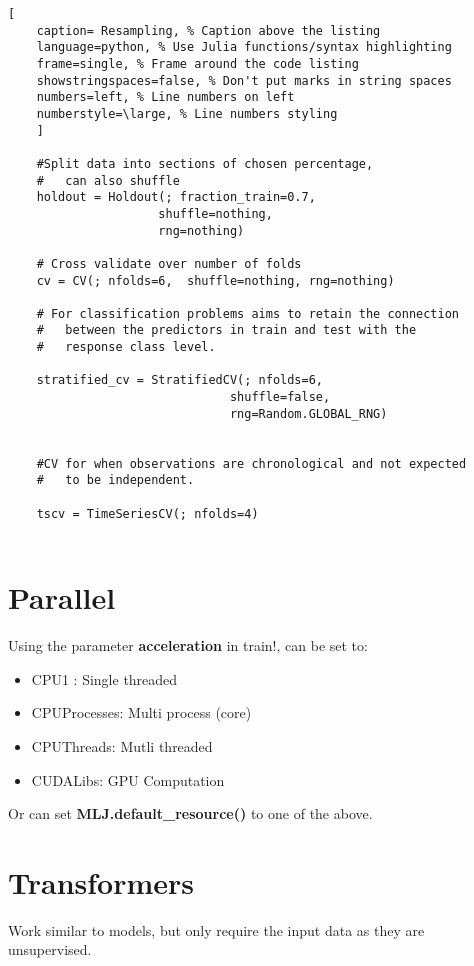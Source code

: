 \documentclass[11pt]{scrartcl} %
\begin{document}
\begin{lstlisting}[
	caption= Resampling, % Caption above the listing
	language=python, % Use Julia functions/syntax highlighting
	frame=single, % Frame around the code listing
	showstringspaces=false, % Don't put marks in string spaces
	numbers=left, % Line numbers on left
	numberstyle=\large, % Line numbers styling
	]

	#Split data into sections of chosen percentage, 
	#	can also shuffle
	holdout = Holdout(; fraction_train=0.7,
                     shuffle=nothing,
                     rng=nothing)

	# Cross validate over number of folds
	cv = CV(; nfolds=6,  shuffle=nothing, rng=nothing)

	# For classification problems aims to retain the connection
	#	between the predictors in train and test with the 
	#	response class level.

	stratified_cv = StratifiedCV(; nfolds=6,
                               shuffle=false,
                               rng=Random.GLOBAL_RNG)


	#CV for when observations are chronological and not expected 
	#	to be independent.

	tscv = TimeSeriesCV(; nfolds=4)


\end{lstlisting}

\section{Parallel}

Using the parameter \textbf{acceleration} in train!, can be set to:

\begin{itemize}
	\item CPU1 : Single threaded
	\item CPUProcesses: Multi process (core)
	\item CPUThreads: Mutli threaded
	\item CUDALibs: GPU Computation
\end{itemize}

Or can set \textbf{MLJ.default\_resource()} to one of the above.

\section{Transformers}

Work similar to models, but only require the input data as they are unsupervised.
\end{document}

